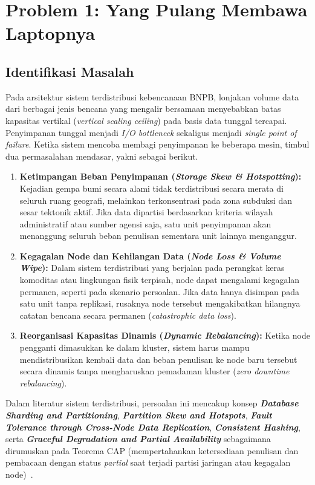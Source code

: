 \section{Problem 1: Yang Pulang Membawa Laptopnya}
\label{sec:problem_1}

\subsection{Identifikasi Masalah}
Pada arsitektur sistem terdistribusi kebencanaan BNPB, lonjakan volume data dari berbagai jenis bencana yang mengalir bersamaan menyebabkan batas kapasitas vertikal (\textit{vertical scaling ceiling}) pada basis data tunggal tercapai. Penyimpanan tunggal menjadi \textit{I/O bottleneck} sekaligus menjadi \textit{single point of failure}. Ketika sistem mencoba membagi penyimpanan ke beberapa mesin, timbul dua permasalahan mendasar, yakni sebagai berikut.

\begin{enumerate}
    \item \textbf{Ketimpangan Beban Penyimpanan (\textit{Storage Skew \& Hotspotting}):} Kejadian gempa bumi secara alami tidak terdistribusi secara merata di seluruh ruang geografi, melainkan terkonsentrasi pada zona subduksi dan sesar tektonik aktif. Jika data dipartisi berdasarkan kriteria wilayah administratif atau sumber agensi saja, satu unit penyimpanan akan menanggung seluruh beban penulisan sementara unit lainnya menganggur.
    \item \textbf{Kegagalan Node dan Kehilangan Data (\textit{Node Loss \& Volume Wipe}):} Dalam sistem terdistribusi yang berjalan pada perangkat keras komoditas atau lingkungan fisik terpisah, node dapat mengalami kegagalan permanen, seperti pada skenario persoalan. Jika data hanya disimpan pada satu unit tanpa replikasi, rusaknya node tersebut mengakibatkan hilangnya catatan bencana secara permanen (\textit{catastrophic data loss}).
    \item \textbf{Reorganisasi Kapasitas Dinamis (\textit{Dynamic Rebalancing}):} Ketika node pengganti dimasukkan ke dalam kluster, sistem harus mampu mendistribusikan kembali data dan beban penulisan ke node baru tersebut secara dinamis tanpa mengharuskan pemadaman kluster (\textit{zero downtime rebalancing}).
\end{enumerate}

\vspace{1em}

\noindent Dalam literatur sistem terdistribusi, persoalan ini mencakup konsep \textbf{\textit{Database Sharding and Partitioning}}, \textbf{\textit{Partition Skew and Hotspots}}, \textbf{\textit{Fault Tolerance through Cross-Node Data Replication}}, \textbf{\textit{Consistent Hashing}}, serta \textbf{\textit{Graceful Degradation and Partial Availability}} sebagaimana dirumuskan pada Teorema CAP (mempertahankan ketersediaan penulisan dan pembacaan dengan status \textit{partial} saat terjadi partisi jaringan atau kegagalan node)~\cite{kleppmann2017designing,karger1997consistent,brewer2000towards,gilbert2002brewer}.

